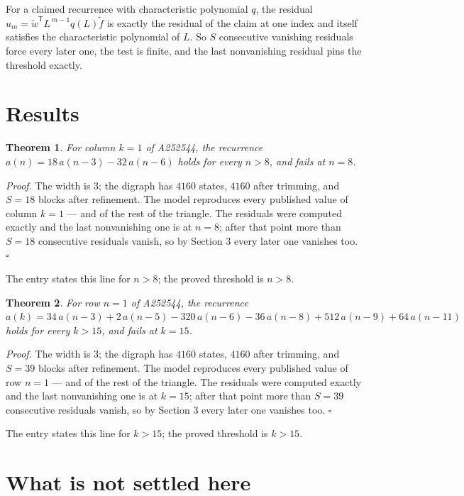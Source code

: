 \documentclass[11pt]{article}
\newtheorem{theorem}{Theorem}
\theoremstyle{definition}
\begin{document}
For a claimed recurrence with characteristic polynomial $q$, the residual $u_m = \tilde w^{\mathsf T}L^{\,m-1}q(L)\tilde f$ is exactly the residual of the claim at one index and itself satisfies the characteristic polynomial of $L$. So $S$ consecutive vanishing residuals force every later one, the test is finite, and the last nonvanishing residual pins the threshold exactly.

\section{Results}

\begin{theorem} For column $k = 1$ of A252544, the recurrence $a(n) = 18\,a(n-3) - 32\,a(n-6)$ holds for every $n > 8$, and fails at $n = 8$.\end{theorem}

{\itshape Proof.} The width is $3$; the digraph has $4160$ states, $4160$ after trimming, and $S = 18$ blocks after refinement. The model reproduces every published value of column $k = 1$ --- and of the rest of the triangle. The residuals were computed exactly and the last nonvanishing one is at $n = 8$; after that point more than $S = 18$ consecutive residuals vanish, so by Section 3 every later one vanishes too. $\square$

The entry states this line for $n > 8$; the proved threshold is $n > 8$.

\begin{theorem} For row $n = 1$ of A252544, the recurrence $a(k) = 34\,a(n-3) + 2\,a(n-5) - 320\,a(n-6) - 36\,a(n-8) + 512\,a(n-9) + 64\,a(n-11)$ holds for every $k > 15$, and fails at $k = 15$.\end{theorem}

{\itshape Proof.} The width is $3$; the digraph has $4160$ states, $4160$ after trimming, and $S = 39$ blocks after refinement. The model reproduces every published value of row $n = 1$ --- and of the rest of the triangle. The residuals were computed exactly and the last nonvanishing one is at $k = 15$; after that point more than $S = 39$ consecutive residuals vanish, so by Section 3 every later one vanishes too. $\square$

The entry states this line for $k > 15$; the proved threshold is $k > 15$.

\section{What is not settled here}
\end{document}
